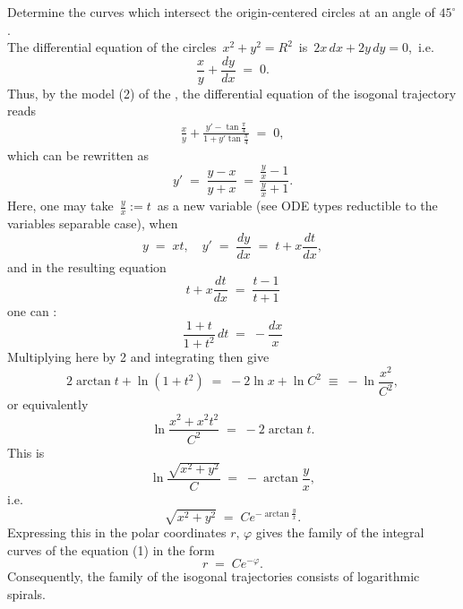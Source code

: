 \documentclass[12pt]{article}
\theoremstyle{definition}
\begin{document}
Determine the curves which intersect the origin-centered circles at an angle of $45^\circ$.\\


The differential equation of the circles \,$x^2\!+\!y^2 = R^2$\, is\, $2x\,dx+2y\,dy = 0$,\, i.e.
$$\frac{x}{y}+\frac{dy}{dx} \;=\; 0.$$
Thus, by the model (2) of the , the differential equation of the isogonal trajectory reads
\begin{align}
\frac{x}{y}+\frac{y'-\tan\frac{\pi}{4}}{1+y'\tan\frac{\pi}{4}} \;=\; 0,
\end{align}
which can be rewritten as
$$y' \;=\; \frac{y\!-\!x}{y\!+\!x} \;=\, \frac{\frac{y}{x}\!-\!1}{\frac{y}{x}\!+\!1}.$$
Here, one may take\, $\frac{y}{x} := t$\, as a new variable (see ODE types reductible to the variables separable case), when
$$y \;=\; xt, \quad y' \;=\; \frac{dy}{dx} \;=\; t+x\frac{dt}{dx},$$
and in the resulting equation
$$t+x\frac{dt}{dx} \;=\; \frac{t\!-\!1}{t\!+\!1}$$
one can :
$$\frac{1\!+\!t}{1\!+\!t^2}\,dt \;=\; -\frac{dx}{x}$$
Multiplying here by 2 and integrating then give
$$2\arctan{t}+\ln(1\!+\!t^2) \;=\; -2\ln{x}+\ln{C^2} \;\equiv\; -\ln\frac{x^2}{C^2},$$
or equivalently
$$\ln\frac{x^2\!+\!x^2t^2\!}{C^2} \;=\; -2\arctan{t}.$$
This is
$$\ln\frac{\sqrt{x^2\!+\!y^2}}{C} \;=\; -\arctan\frac{y}{x},$$
i.e.
$$\sqrt{x^2\!+\!y^2} \;=\; Ce^{-\arctan\frac{y}{x}}.$$
Expressing this in the polar coordinates $r,\,\varphi$ gives the family of the integral curves of the equation (1) in the form
$$r \;=\; Ce^{-\varphi}.$$
Consequently, the family of the isogonal trajectories consists of logarithmic spirals.



\end{document}
